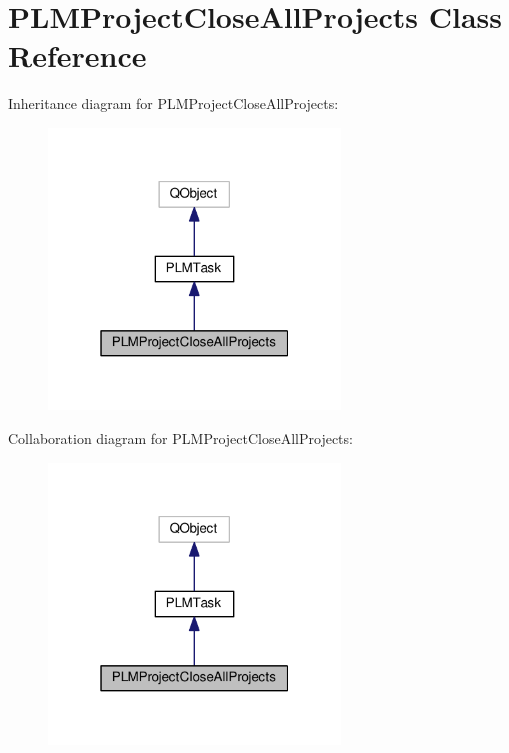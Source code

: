 \hypertarget{class_p_l_m_project_close_all_projects}{}\section{P\+L\+M\+Project\+Close\+All\+Projects Class Reference}
\label{class_p_l_m_project_close_all_projects}


Inheritance diagram for P\+L\+M\+Project\+Close\+All\+Projects\+:\nopagebreak
\begin{figure}[H]
\begin{center}
\leavevmode
\includegraphics[width=220pt]{class_p_l_m_project_close_all_projects__inherit__graph}
\end{center}
\end{figure}


Collaboration diagram for P\+L\+M\+Project\+Close\+All\+Projects\+:\nopagebreak
\begin{figure}[H]
\begin{center}
\leavevmode
\includegraphics[width=220pt]{class_p_l_m_project_close_all_projects__coll__graph}
\end{center}
\end{figure}
